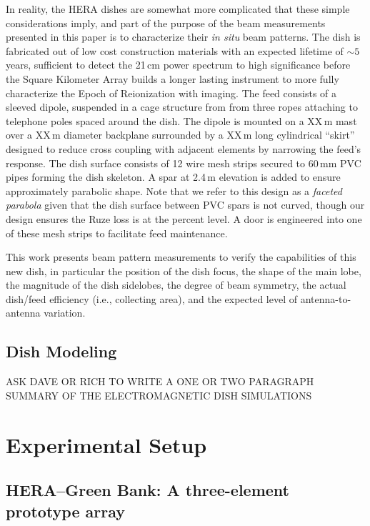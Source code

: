 \documentclass{emulateapj}
\begin{document}
In reality, the HERA dishes are somewhat more complicated that these simple considerations 
imply, and part of the purpose of the beam measurements presented in this paper is to 
characterize their \textit{in situ} beam patterns. The dish is fabricated out of low cost 
construction materials with an expected lifetime of $\sim5$ years, sufficient to detect the 21\,cm 
power spectrum to high significance before the Square Kilometer Array builds a longer lasting 
instrument to more fully characterize the Epoch of Reionization with imaging. The feed consists 
of a sleeved dipole, suspended in a cage structure from from three ropes attaching to telephone 
poles spaced around the dish. The dipole is mounted on a XX\,m mast over a XX\,m diameter backplane surrounded by a XX\,m long cylindrical ``skirt'' designed to reduce cross coupling with adjacent elements 
by narrowing the feed's response. The dish surface consists of 12 wire mesh strips secured to 
60\,mm PVC pipes forming the dish skeleton. A spar at 2.4\,m elevation is added to ensure 
approximately parabolic shape. Note that we refer to this design as a \textit{faceted parabola} 
given that the dish surface between PVC spars is not curved, though our design ensures the 
Ruze loss is at the percent level. A door is engineered into one of these mesh strips to facilitate 
feed maintenance.

This work presents beam pattern measurements to verify the capabilities of this new dish, in particular the 
position of the dish focus, the shape of the main lobe, the magnitude of the dish sidelobes, the 
degree of beam symmetry, the actual dish/feed efficiency (i.e., collecting area), and the expected level of antenna-to-antenna variation.

\subsection{Dish Modeling}
\label{sec:dishmodels}

ASK DAVE OR RICH TO WRITE A ONE OR TWO PARAGRAPH SUMMARY OF THE ELECTROMAGNETIC DISH SIMULATIONS

\section{Experimental Setup}

\subsection{HERA--Green Bank: A three-element prototype array}
\end{document}
